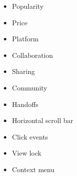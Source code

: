     \begin{itemize}
    \setlength\itemsep{-0.5em}    
        \item{Popularity}
        \item{Price}
        \item{Platform}
        \item{Collaboration}
        \item{Sharing}
        \item{Community}
        \item{Handoffs}
        \item{Horizontal scroll bar}
        \item{Click events}
        \item{View lock}
        \item{Context menu}
    \end{itemize}